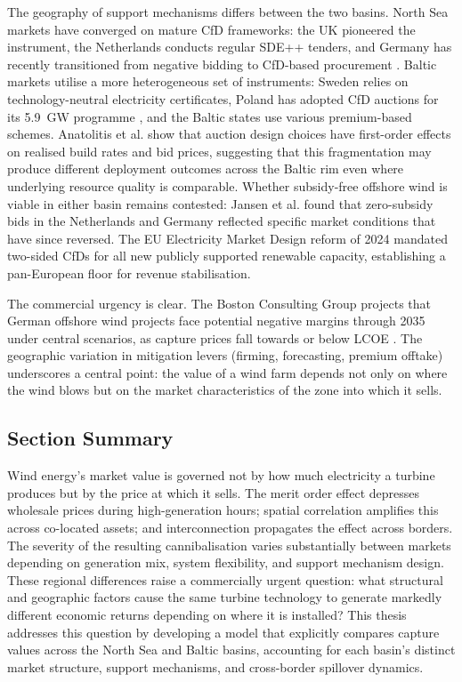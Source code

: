 \vspace{4pt}

The geography of support mechanisms differs between the two basins. North Sea markets have converged on mature CfD frameworks: the UK pioneered the instrument, the Netherlands conducts regular SDE++ tenders, and Germany has recently transitioned from negative bidding to CfD-based procurement \cite{WindEurope2025}. Baltic markets utilise a more heterogeneous set of instruments: Sweden relies on technology-neutral electricity certificates, Poland has adopted CfD auctions for its 5.9~GW programme \cite{Owczarek2021}, and the Baltic states use various premium-based schemes. Anatolitis et al. \cite{Anatolitis2025} show that auction design choices have first-order effects on realised build rates and bid prices, suggesting that this fragmentation may produce different deployment outcomes across the Baltic rim even where underlying resource quality is comparable. Whether subsidy-free offshore wind is viable in either basin remains contested: Jansen et al. \cite{Jansen2020} found that zero-subsidy bids in the Netherlands and Germany reflected specific market conditions that have since reversed. The EU Electricity Market Design reform of 2024 \cite{EUMarketReform2024} mandated two-sided CfDs for all new publicly supported renewable capacity, establishing a pan-European floor for revenue stabilisation.

\vspace{4pt}

The commercial urgency is clear. The Boston Consulting Group \cite{BCG2025} projects that German offshore wind projects face potential negative margins through 2035 under central scenarios, as capture prices fall towards or below LCOE \cite{BCG2025, IRENA2025Costs}. The geographic variation in mitigation levers (firming, forecasting, premium offtake) underscores a central point: the value of a wind farm depends not only on where the wind blows but on the market characteristics of the zone into which it sells.

\subsection{Section Summary}\label{sec:value_summary}

Wind energy's market value is governed not by how much electricity a turbine produces but by the price at which it sells. The merit order effect depresses wholesale prices during high-generation hours; spatial correlation amplifies this across co-located assets; and interconnection propagates the effect across borders. The severity of the resulting cannibalisation varies substantially between markets depending on generation mix, system flexibility, and support mechanism design. These regional differences raise a commercially urgent question: what structural and geographic factors cause the same turbine technology to generate markedly different economic returns depending on where it is installed? This thesis addresses this question by developing a model that explicitly compares capture values across the North Sea and Baltic basins, accounting for each basin's distinct market structure, support mechanisms, and cross-border spillover dynamics.
